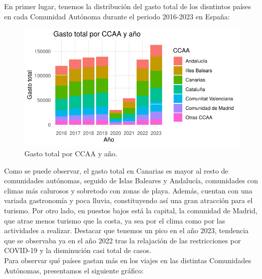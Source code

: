 \documentclass[data,article,submit,moreauthors,pdftex]{Definitions/mdpi}
\begin{document}
En primer lugar, tenemos la distribución del gasto total de los disntintos países en cada Comunidad Autónoma durante el periodo 2016-2023 en España:

\begin{figure}[H]
\includegraphics{ProyectoAED2024_Rmd_files/figure-latex/unnamed-chunk-22-1} \caption{Gasto total por CCAA y año.\label{fig:GastototalporCCAAyaño}}\label{fig:unnamed-chunk-22}
\end{figure}

Como se puede observar, el gasto total en Canarias es mayor al resto de comunidades autónomas, seguido de Islas Baleares y Andalucía, comunidades con climas más calurosos y sobretodo con zonas de playa. Además, cuentan con una variada gastronomía y poca lluvia, constituyendo así una gran atracción para el turismo. Por otro lado, en puestos bajos está la capital, la comunidad de Madrid, que atrae menos turismo que la costa, ya sea por el clima como por las actividades a realizar. Destacar que tenemos un pico en el año 2023, tendencia que se observaba ya en el año 2022 tras la relajación de las restricciones por COVID-19 y la disminución casi total de casos.\\

Para observar qué países gastan más en los viajes en las distintas Comunidades Autónomas, presentamos el siguiente gráfico:
\end{document}
